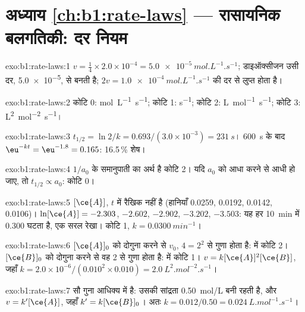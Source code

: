 \section*{अध्याय \ref{ch:b1:rate-laws} --- रासायनिक बलगतिकी: दर नियम}

\begin{solution}{exo:b1:rate-laws:1}
$v = \frac14 \times 2.0 \times 10^{-4} = \qty{5.0e-5}{mol.L^{-1}.s^{-1}}$;
डाइऑक्सीजन उसी दर, \qty{5.0e-5}{}, से बनती है; 
$2v = \qty{1.0e-4}{mol.L^{-1}.s^{-1}}$ की दर से लुप्त होता है।
\end{solution}

\begin{solution}{exo:b1:rate-laws:2}
कोटि 0: \unit{mol.L^{-1}.s^{-1}}; कोटि 1: \unit{s^{-1}}; कोटि 2:
\unit{L.mol^{-1}.s^{-1}}; कोटि 3: \unit{L^2.mol^{-2}.s^{-1}}।
\end{solution}

\begin{solution}{exo:b1:rate-laws:3}
$t_{1/2} = \ln2/k = 0.693/(3.0 \times 10^{-3}) = \qty{231}{s}$।
\qty{600}{s} के बाद $\eu^{-kt} = \eu^{-1.8} = 0.165$: 16.5\,\% शेष।
\end{solution}

\begin{solution}{exo:b1:rate-laws:4}
$1/a_0$ के समानुपाती  का अर्थ है कोटि 2। यदि $a_0$ को आधा करने से
 आधी हो जाए, तो $t_{1/2} \propto a_0$: कोटि 0।
\end{solution}

\begin{solution}{exo:b1:rate-laws:5}
$[\ce{A}]$, $t$ में रैखिक नहीं है (हानियाँ 0.0259, 0.0192, 0.0142, 0.0106)।
$\ln[\ce{A}] = -2.303$, $-2.602$, $-2.902$, $-3.202$, $-3.503$: यह हर
\qty{10}{min} में 0.300 घटता है, एक सरल रेखा। कोटि 1, $k =
\qty{0.0300}{min^{-1}}$।
\end{solution}

\begin{solution}{exo:b1:rate-laws:6}
$[\ce{A}]_0$ को दोगुना करने से $v_0$, $4 = 2^2$ से गुणा होता है:  में कोटि 2।
$[\ce{B}]_0$ को दोगुना करने से वह 2 से गुणा होता है:  में कोटि 1। $v =
k[\ce{A}]^2[\ce{B}]$, जहाँ $k = 2.0 \times 10^{-6}/(0.010^2 \times 0.010) =
\qty{2.0}{L^2.mol^{-2}.s^{-1}}$।
\end{solution}

\begin{solution}{exo:b1:rate-laws:7}
 सौ गुना आधिक्य में है: उसकी सांद्रता
\qty{0.50}{mol/L} बनी रहती है, और $v = k'[\ce{A}]$, जहाँ $k' = k[\ce{B}]_0$। अतः
$k = 0.012/0.50 = \qty{0.024}{L.mol^{-1}.s^{-1}}$।
\end{solution}

